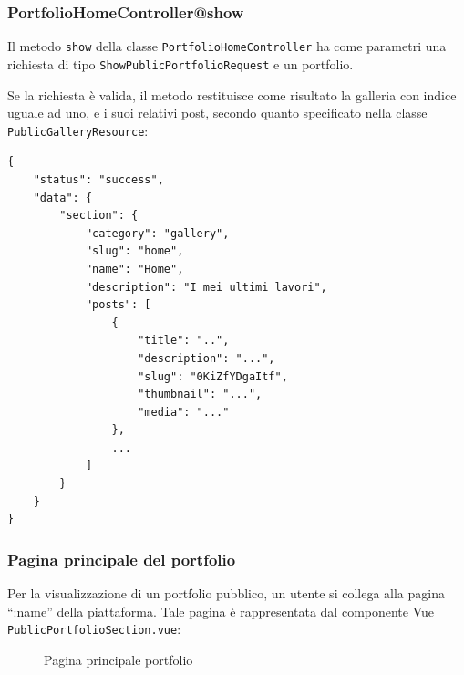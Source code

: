 \subsubsection{PortfolioHomeController@show}
Il metodo \verb|show| della classe \verb|PortfolioHomeController| ha come parametri una richiesta di tipo \verb|ShowPublicPortfolioRequest| e un portfolio.

Se la richiesta \`e valida, il metodo restituisce come risultato la galleria con indice uguale ad uno, e i suoi relativi post, secondo quanto specificato nella classe \verb|PublicGalleryResource|:
\begin{lstlisting}[caption={Risposta di successo sezione principale di un portfolio pubblico}, label={lst:response_success_registration}]
{
	"status": "success",
	"data": {
		"section": {
			"category": "gallery",
			"slug": "home",
			"name": "Home",
			"description": "I mei ultimi lavori",
			"posts": [
				{
					"title": "..",
					"description": "...",
					"slug": "0KiZfYDgaItf",
					"thumbnail": "...",
					"media": "..."
				},
				...
			]
		}
	}
}
\end{lstlisting}

\subsubsection{Pagina principale del portfolio}
Per la visualizzazione di un portfolio pubblico, un utente si collega alla pagina ``:name'' della piattaforma. Tale pagina \`e rappresentata dal componente Vue \verb|PublicPortfolioSection.vue|:
\begin{figure}[htbp]
	\centering
	\fboxsep=0.5pt
	\fboxrule=0.5pt
	\caption{Pagina principale portfolio}
	\label{fig:p-h-view}
\end{figure}


